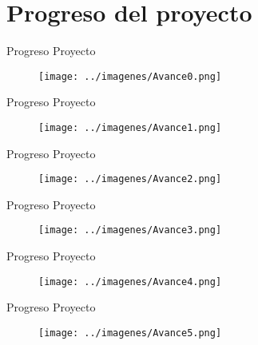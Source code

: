 \documentclass{beamer}
\begin{document}
\section{Progreso del proyecto}\label{progreso-del-proyecto}
\begin{frame}{Progreso Proyecto}

\begin{figure}
\centering
\texttt{[image: ../imagenes/Avance0.png]}
\end{figure}

\end{frame}
\begin{frame}{Progreso Proyecto}

\begin{figure}
\centering
\texttt{[image: ../imagenes/Avance1.png]}
\end{figure}

\end{frame}
\begin{frame}{Progreso Proyecto}

\begin{figure}
\centering
\texttt{[image: ../imagenes/Avance2.png]}
\end{figure}

\end{frame}
\begin{frame}{Progreso Proyecto}

\begin{figure}
\centering
\texttt{[image: ../imagenes/Avance3.png]}
\end{figure}

\end{frame}
\begin{frame}{Progreso Proyecto}

\begin{figure}
\centering
\texttt{[image: ../imagenes/Avance4.png]}
\end{figure}

\end{frame}

\begin{frame}{Progreso Proyecto}

\begin{figure}
\centering
\texttt{[image: ../imagenes/Avance5.png]}
\end{figure}

\end{frame}
\end{document}
